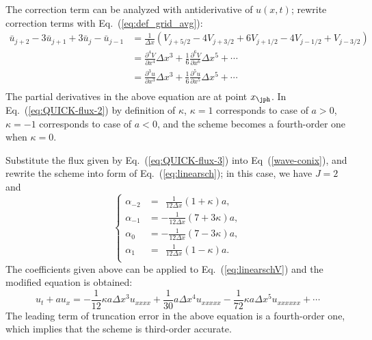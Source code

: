 \documentclass[]{article}
\begin{document}
The correction term can be analyzed with antiderivative of $u(x,t)$; rewrite
correction terms with Eq.~(\ref{eq:def_grid_avg}): 
\begin{equation*}
  \begin{array}{ll}
    \bar u_{j+2}-3\bar u_{j+1}+3\bar u_{j}-\bar u_{j-1}&
    \displaystyle =\frac{1}{\Delta x}
    \left(V_{j+5/2}-4V_{j+3/2}+6V_{j+1/2}-4V_{j-1/2}+V_{j-3/2}\right) \\[3mm]
    &\displaystyle
    =\frac{\partial^4 V}{\partial x^4}\Delta x^3+\frac{1}{6}\frac{\partial^6V}{\partial x^6}\Delta x^5 + \cdots \\[3mm]
    &\displaystyle
    =\frac{\partial^3 u}{\partial x^3}\Delta x^3+\frac{1}{6}\frac{\partial^5u}{\partial x^5}\Delta x^5 + \cdots \\
  \end{array}
\end{equation*}
The partial derivatives in the above equation are at point $x_\jph$. In
Eq.~(\ref{eq:QUICK-flux-2}) by definition of $\kappa$, $\kappa=1$ corresponds to
case of $a>0$, $\kappa=-1$ corresponds to case of $a<0$, and the scheme becomes
a fourth-order one when $\kappa=0$.

Substitute the flux given by Eq.~(\ref{eq:QUICK-flux-3}) into
Eq~(\ref{wave-conix}), and rewrite the scheme into form of
Eq.~(\ref{eq:linearsch}); in this case, we have $J = 2$ and
\begin{equation}
  \left\{\begin{array}{ll}
  \alpha_{-2}&\displaystyle =\ \ \frac{1}{12\Delta x}(1+\kappa)a,\\[3mm]
  \alpha_{-1}&\displaystyle = -\frac{1}{12\Delta x}(7+3\kappa)a,\\[3mm]
  \alpha_{0}&\displaystyle = -\frac{1}{12\Delta x}(7-3\kappa)a,\\[3mm]
  \alpha_{1}&\displaystyle =\ \ \frac{1}{12\Delta x}(1-\kappa)a.\\
  \end{array}\right.
  \label{eq:coeff-of-alpha-in-quick}
\end{equation}
The coefficients given above can be applied to Eq.~(\ref{eq:linearschV})
and the modified equation is obtained:
\begin{equation}
  u_t+au_x =-\frac{1}{12}\kappa a \Delta x^3 u_{xxxx}+\frac{1}{30}a \Delta x^4 u_{xxxxx} -\frac{1}{72} \kappa a \Delta x^5 u_{xxxxxx} +\cdots
  \label{eq:modified-quick}
\end{equation}
The leading term of truncation error in the above equation is a fourth-order
one, which implies that the scheme is third-order accurate.
\end{document}

